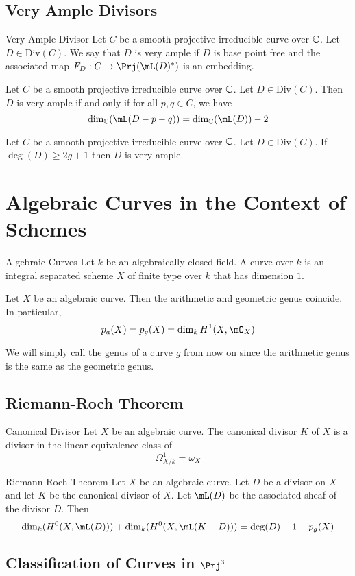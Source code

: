 \documentclass[a4paper]{article}
\begin{document}
\subsection{Very Ample Divisors}
\begin{defn}{Very Ample Divisor}{} Let $C$ be a smooth projective irreducible curve over $\mathbb{C}$. Let $D\in\text{Div}(C)$. We say that $D$ is very ample if $D$ is base point free and the associated map $F_D:C\to\Prj(\mL(D)^\ast)$ is an embedding. 
\end{defn}

\begin{prp}{}{} Let $C$ be a smooth projective irreducible curve over $\mathbb{C}$. Let $D\in\text{Div}(C)$. Then $D$ is very ample if and only if for all $p,q\in C$, we have $$\dim_\C(\mL(D-p-q))=\dim_\C(\mL(D))-2$$
\end{prp}

\begin{crl}{}{} Let $C$ be a smooth projective irreducible curve over $\mathbb{C}$. Let $D\in\text{Div}(C)$. If $\deg(D)\geq 2g+1$ then $D$ is very ample. 
\end{crl}


\pagebreak
\section{Algebraic Curves in the Context of Schemes}
\begin{defn}{Algebraic Curves}{} Let $k$ be an algebraically closed field. A curve over $k$ is an integral separated scheme $X$ of finite type over $k$ that has dimension $1$. 
\end{defn}

\begin{prp}{}{} Let $X$ be an algebraic curve. Then the arithmetic and geometric genus coincide. In particular, $$p_a(X)=p_g(X)=\dim_kH^1(X,\mO_X)$$
\end{prp}

We will simply call the genus of a curve $g$ from now on since the arithmetic genus is the same as the geometric genus. 

\subsection{Riemann-Roch Theorem}
\begin{defn}{Canonical Divisor}{} Let $X$ be an algebraic curve. The canonical divisor $K$ of $X$ is a divisor in the linear equivalence class of $$\Omega_{X/k}^1=\omega_X$$
\end{defn}

\begin{thm}{Riemann-Roch Theorem}{} Let $X$ be an algebraic curve. Let $D$ be a divisor on $X$ and let $K$ be the canonical divisor of $X$. Let $\mL(D)$ be the associated sheaf of the divisor $D$. Then $$\dim_k(H^0(X,\mL(D)))+\dim_k(H^0(X,\mL(K-D)))=\deg(D)+1-p_g(X)$$
\end{thm}

\subsection{Classification of Curves in $\Prj^3$}
\end{document}
